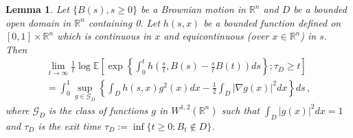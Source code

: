 \documentclass[12pt,reqno]{amsart}
\newtheorem{lemma}[theorem]{Lemma}
\theoremstyle{remark}
\newcommand{\1}{\mathbf{1}}
\def\RR{\mathbb{R}}
\def\EE{\mathbb{E}}
\def\cgg{{\mathcal G}}
\def\lt{\left}
\def\rt{\right}
\begin{document}
		\begin{lemma}\label{lem:expBB}
		Let $\{B(s),s\ge0\}$ be a Brownian motion in $\RR^n$ and $D$ be a bounded open domain in $\RR^n$ containing 0. Let $h(s,x)$ be a bounded function defined on $[0,1]\times\RR^n$ which is continuous in $x$ and equicontinuous (over $x\in\RR^n$) in $s$. Then
		\begin{multline}\label{lim:fBB}
			\lim_{t\to\infty}\frac1t\log \EE \lt[\exp\left\{\int_0^t h\left(\frac st,B(s)-\frac st B(t)\right)ds \right\};\tau_D\ge t\rt]
			\\=\int_0^1\sup_{g\in \cgg_D }\left\{\int_{D} h(s,x) g^2(x)dx-\frac12\int_{D}|\nabla g(x)|^2dx \right\}ds\,,
		\end{multline}
		where $\cgg_D$ is the class of functions $g$ in $W^{1,2}(\RR^n)$ such that $\int_{D}|g(x)|^2dx=1$ and $\tau_D$ is the exit time $\tau_D := \inf\{t\geq 0: B_t \notin D\}$. 
	\end{lemma}
\end{document}
